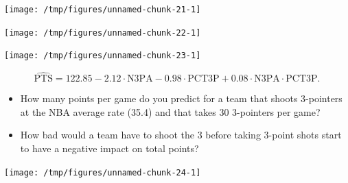 \documentclass{beamer}\usepackage[]{graphicx}\usepackage[]{color}
\newenvironment{knitrout}{}{} %
\begin{document}
\begin{darkframes}
    \begin{frame}
\begin{knitrout}
\color{fgcolor}
\texttt{[image: /tmp/figures/unnamed-chunk-21-1]} 

\end{knitrout}
    \end{frame}

    \begin{frame}
\begin{knitrout}
\color{fgcolor}
\texttt{[image: /tmp/figures/unnamed-chunk-22-1]} 

\end{knitrout}
    \end{frame}

    \begin{frame}
\begin{knitrout}
\color{fgcolor}
\texttt{[image: /tmp/figures/unnamed-chunk-23-1]} 

\end{knitrout}

    \end{frame}
    \begin{frame}
      \[
        \widehat{\text{PTS}} = 122.85
          - 2.12 \cdot\text{N3PA}
          - 0.98 \cdot\text{PCT3P}
          + 0.08 \cdot\text{N3PA}\cdot\text{PCT3P}.
      \]

      \begin{itemize}
        \item How many points per game do you predict for a team that shoots 3-pointers at the NBA average rate (35.4) and that takes 30 3-pointers per game?
        \pause
        \item How bad would a team have to shoot the 3 before taking 3-point shots start to have a negative impact on total points?
      \end{itemize}
    \end{frame}

    \begin{frame}
\begin{knitrout}
\color{fgcolor}
\texttt{[image: /tmp/figures/unnamed-chunk-24-1]} 

\end{knitrout}
    \end{frame}
  \end{darkframes}
\end{document}
